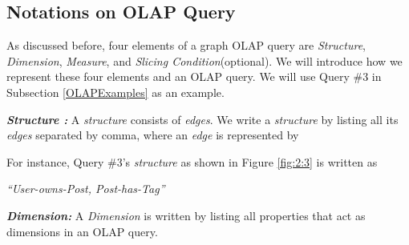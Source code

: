 %
%
%
%
%
%
%

\subsection{Notations on OLAP Query}

As discussed before, four elements of a graph OLAP query are \textit{Structure}, \textit{Dimension}, \textit{Measure}, and \textit{Slicing Condition}(optional). We will introduce how we represent these four elements and an OLAP query. We will use Query \#3 in Subsection \ref{OLAPExamples} as an example.

\textbf{\textit{Structure :}} A \textit{structure} consists of \textit{edges}. We write a \textit{structure} by listing all its \textit{edges} separated by comma, where an \textit{edge} is represented by 


For instance, Query \#3's \textit{structure} as shown in Figure \ref{fig:2:3} is written as 

\textit{``User-owns-Post, Post-has-Tag''}



\textbf{\textit{Dimension:}} A
\textit{Dimension} is written by listing all properties that act as dimensions in an OLAP query.

